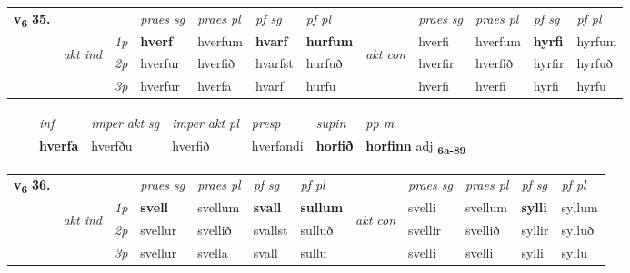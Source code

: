 \begin{tabular}{llllllllllll} \toprule
\multirow{4}{*}{{{\textbf{v{\textsubscript{6}}} \Large{\textbf{35.}}}}}  & &   &  \textit{praes sg}  & \textit{praes pl}  &\textit{ pf sg} & \textit{pf pl} &  &  \textit{praes sg}  & \textit{praes pl}  & \textit{pf sg} & \textit{pf pl } \\*
	\cmidrule{4-7} \cmidrule{9-12}
 & \multirow{3}{*}{\begin{turn}{90}\textit{akt ind}\end{turn}} & {\textit{1p}} & \textbf{hverf} & hverfum    & \textbf{hvarf} & \textbf{hurfum} & \multirow{3}{*}{\begin{turn}{90}\textit{akt con}\end{turn}} &hverfi & hverfum & \textbf{hyrfi} & hyrfum\\*
& &  {\textit{2p}} &  hverfur  & hverfið   & hvarfst & hurfuð & & hverfir & hverfið & hyrfir & hyrfuð \\*
& &  {\textit{3p}} & hverfur & hverfa   & hvarf & hurfu & & hverfi & hverfi& hyrfi & hyrfu  \\*
\cmidrule{4-7} \cmidrule{9-12}
\end{tabular}


\begin{tabular}{llllllllllll}
 & & \textit{inf} & \textit{imper akt sg} & \textit{imper akt pl}   & \textit{presp} & \textit{supin}  & \textit{pp m}     \\*
  & & \textbf{hverfa} & hverfðu  & hverfið   & hverfandi &  \textbf{horfið}  & \textbf{horfinn} adj \textbf{\textsubscript{6a-89}} \\*
\cmidrule{1-12}
\end{tabular}



\begin{tabular}{llllllllllll} \toprule
\multirow{4}{*}{{{\textbf{v{\textsubscript{6}}} \Large{\textbf{36.}}}}}  & &   &  \textit{praes sg}  & \textit{praes pl}  &\textit{ pf sg} & \textit{pf pl} &  &  \textit{praes sg}  & \textit{praes pl}  & \textit{pf sg} & \textit{pf pl } \\*
	\cmidrule{4-7} \cmidrule{9-12}
 & \multirow{3}{*}{\begin{turn}{90}\textit{akt ind}\end{turn}} & {\textit{1p}} & \textbf{svell} & svellum    & \textbf{svall} & \textbf{sullum} & \multirow{3}{*}{\begin{turn}{90}\textit{akt con}\end{turn}} &svelli & svellum & \textbf{sylli} & syllum\\*
& &  {\textit{2p}} &  svellur  & svellið   & svallst & sulluð & & svellir & svellið & syllir & sylluð \\*
& &  {\textit{3p}} & svellur & svella   & svall & sullu & & svelli & svelli& sylli & syllu  \\*
\cmidrule{4-7} \cmidrule{9-12}
\end{tabular}


